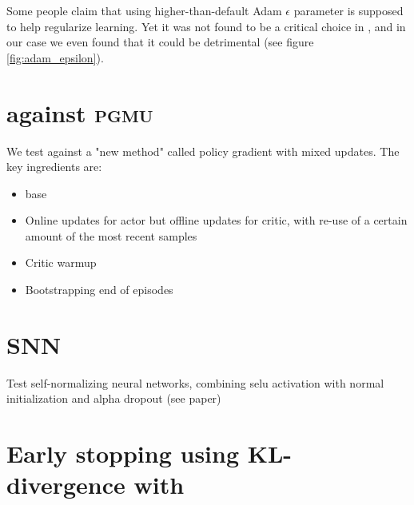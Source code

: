 Some people claim that using higher-than-default Adam $\epsilon$ parameter is supposed to help regularize learning. Yet it was not found to be a critical choice in \cite{andrychowicz2020}, and in our case we even found that it could be detrimental (see figure \ref{fig:adam_epsilon}).



\section{\ppo against \textsc{pgmu}}

We test \ppo against a "new method" called policy gradient with mixed updates. The key ingredients are:

\begin{itemize}
	\item \ppo base
	\item Online updates for actor but offline updates for critic, with re-use of a certain amount of the most recent samples
	\item Critic warmup
	\item Bootstrapping end of episodes
\end{itemize}



\section{SNN}

Test self-normalizing neural networks, combining selu activation with normal initialization and alpha dropout (see paper)

\section{Early stopping using KL-divergence with \ppo}

